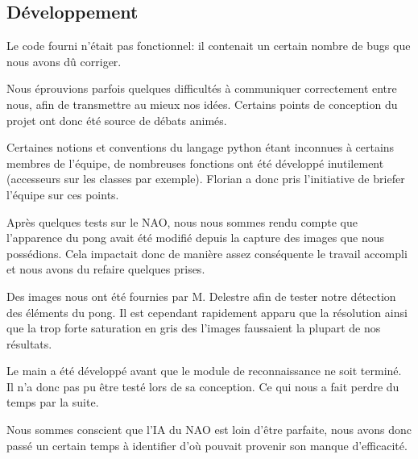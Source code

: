 \subsection{Développement}
\par Le code fourni n'était pas fonctionnel: il contenait un certain nombre de bugs que nous avons dû corriger.
\par Nous éprouvions parfois quelques difficultés à communiquer correctement entre nous, afin de transmettre au mieux nos idées. Certains points de conception du projet ont donc été source de débats animés.
\par Certaines notions et conventions du langage python étant inconnues à certains membres de l'équipe, de nombreuses fonctions ont été développé inutilement (accesseurs sur les classes par exemple). Florian a donc pris l’initiative de briefer l’équipe sur ces points.
\par Après quelques tests sur le NAO, nous nous sommes rendu compte que l’apparence du pong avait été modifié depuis la capture des images que nous possédions. Cela impactait donc de manière assez conséquente le travail accompli et nous avons du refaire quelques prises.
\par Des images nous ont été fournies par M. Delestre afin de tester notre détection des éléments du pong. Il est cependant rapidement apparu que la résolution ainsi que la trop forte saturation en gris des l’images faussaient la plupart de nos résultats.
\par Le main a été développé avant que le module de reconnaissance ne soit terminé. Il n’a donc pas pu être testé lors de sa conception. Ce qui nous a fait perdre du temps par la suite.
\par Nous sommes conscient que l'IA du NAO est loin d'être parfaite, nous avons donc passé un certain temps à identifier d'où pouvait provenir son manque d'efficacité.

\pagebreak
